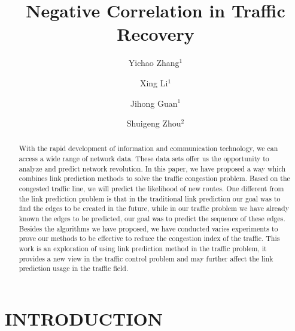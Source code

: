 \documentclass[onecolumn,preprintnumbers,amsmath,amssymb]{revtex4}
\begin{document}
\title{Negative Correlation in Traffic Recovery}

\author{Yichao Zhang$^{1}$}

\author{Xing Li$^{1}$}


\author{Jihong Guan$^{1}$}


\author{Shuigeng Zhou$^{2}$}



\begin{abstract}
With the rapid development of information and communication technology, we can access a wide range of network data. These data sets offer us the opportunity to analyze and predict network revolution. In this paper, we have proposed a way which combines link prediction methods to solve the traffic congestion problem. Based on the congested traffic line, we will predict the likelihood of new routes. One different from the link prediction problem is that in the traditional link prediction our goal was to find the edges to be created in the future, while in our traffic problem we have already known the edges to be predicted, our goal was to predict the sequence of these edges. Besides the algorithms we have proposed, we have conducted varies experiments to prove our methods to be effective to reduce the congestion index of the traffic. This work is an exploration of using link prediction method in the traffic problem, it provides a new view in the traffic control problem and may further affect the link prediction usage in the traffic field. 
\end{abstract}


\maketitle

\section*{INTRODUCTION\protect}
\end{document}
